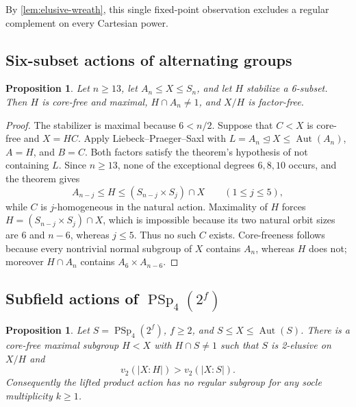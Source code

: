 \documentclass[11pt]{amsart}
\newcommand{\Aut}{\operatorname{Aut}}
\newcommand{\PSp}{\operatorname{PSp}}
\newtheorem{proposition}[theorem]{Proposition}
\theoremstyle{definition}
\begin{document}
By \cref{lem:elusive-wreath}, this single fixed-point observation excludes a
regular complement on every Cartesian power.

\subsection{Six-subset actions of alternating groups}

\begin{proposition}\label{prop:alternating-six}
Let \(n\ge13\), let \(A_n\leq X\leq S_n\), and let \(H\) stabilize a
6-subset.  Then \(H\) is core-free and maximal, \(H\cap A_n\ne1\), and
\(X/H\) is factor-free.
\end{proposition}

\begin{proof}
The stabilizer is maximal because \(6<n/2\).  Suppose that \(C<X\) is
core-free and \(X=HC\). Apply Liebeck--Praeger--Saxl
\cite[Theorem D and Remark 2]{lps-maxfact} with
\(L=A_n\trianglelefteq X\leq\Aut(A_n)\),
\(A=H\), and \(B=C\).  Both factors satisfy the theorem's hypothesis of
not containing \(L\).  Since \(n\ge13\), none of the exceptional degrees
\(6,8,10\) occurs, and the theorem gives
\[
 A_{n-j}\leq H\leq (S_{n-j}\times S_j)\cap X
 \qquad (1\leq j\leq5),
\]
while \(C\) is \(j\)-homogeneous in the natural action.  Maximality of
\(H\) forces \(H=(S_{n-j}\times S_j)\cap X\), which is impossible because
its two natural orbit sizes are \(6\) and \(n-6\), whereas \(j\leq5\).
Thus no such \(C\) exists.  Core-freeness follows because every nontrivial
normal subgroup of \(X\) contains \(A_n\), whereas \(H\) does not; moreover
\(H\cap A_n\) contains \(A_6\times A_{n-6}\).
\end{proof}

\subsection{\texorpdfstring{Subfield actions of \(\PSp_4(2^f)\)}%
{Subfield actions of PSp4(2^f)}}

\begin{proposition}\label{prop:sp4-subfield}
Let \(S=\PSp_4(2^f)\), \(f\ge2\), and
\(S\leq X\leq\Aut(S)\).  There is a core-free maximal subgroup \(H<X\)
with \(H\cap S\ne1\) such that \(S\) is 2-elusive on \(X/H\) and
\[
v_2(\lvert X:H\rvert)>v_2(\lvert X:S\rvert).
\]
Consequently the lifted product action has no regular subgroup for any
socle multiplicity \(k\ge1\).
\end{proposition}
\end{document}
